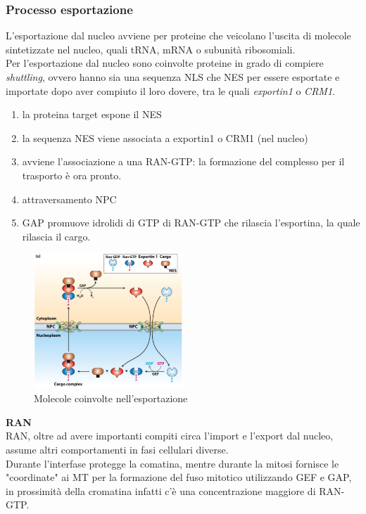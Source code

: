         \subsubsection{Processo esportazione}
            L'esportazione dal nucleo avviene per proteine che veicolano l'uscita di molecole sintetizzate nel nucleo, quali tRNA, mRNA o subunità ribosomiali.\\
            Per l'esportazione dal nucleo sono coinvolte proteine in grado di compiere \textit{shuttling}, ovvero hanno sia una sequenza NLS che NES per essere esportate e importate dopo aver compiuto il loro dovere, tra le quali \textit{exportin1} o \textit{CRM1}.
            \begin{enumerate}
                \item la proteina target espone il NES
                \item la sequenza NES viene associata a exportin1 o CRM1 (nel nucleo)
                \item avviene l'associazione a una RAN-GTP: la formazione del complesso per il trasporto è ora pronto.
                \item attraversamento NPC
                \item GAP promuove idrolidi di GTP di RAN-GTP che rilascia l'esportina, la quale rilascia il cargo.
            \end{enumerate}
            \begin{figure}[h]
                \centering
                \includegraphics[width=0.5\textwidth]{images/exportNucleo.JPG}
                \caption{\small Molecole coinvolte nell'esportazione}
                \label{fig:mesh1}
            \end{figure}
            
            \textbf{RAN}\\
                RAN, oltre ad avere importanti compiti circa l'import e l'export dal nucleo, assume altri comportamenti in fasi cellulari diverse.\\
                Durante l'interfase protegge la comatina, mentre durante la mitosi fornisce le "coordinate" ai MT per la formazione del fuso mitotico utilizzando GEF e GAP, in prossimità della cromatina infatti c'è una concentrazione maggiore di RAN-GTP.
                
